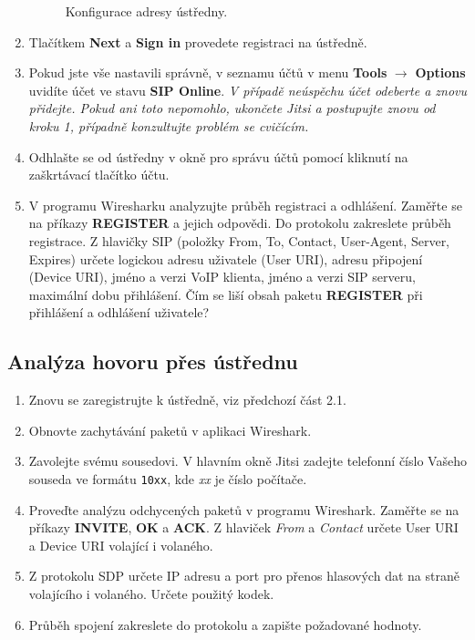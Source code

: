 \begin{enumerate}
\begin{figure}[h!]
        \caption{Konfigurace adresy ústředny.}
        \label{fig:registration2}
      \end{figure}
    \item Tlačítkem {\bf Next} a {\bf Sign in} provedete registraci na ústředně.
    \item  Pokud jste vše nastavili správně, v seznamu účtů v menu {\bf Tools} $\rightarrow$ {\bf Options} uvidíte účet ve stavu {\bf SIP Online}. {\it V případě neúspěchu účet odeberte a znovu přidejte. Pokud ani toto nepomohlo, ukončete Jitsi a postupujte znovu od kroku 1, případně konzultujte problém se cvičícím.}
    \item Odhlašte se od ústředny v okně pro správu účtů pomocí kliknutí na
      zaškrtávací tlačítko účtu.
    \item V programu Wiresharku analyzujte průběh registraci a odhlášení. Zaměřte se na příkazy {\bf REGISTER} a jejich odpovědi. Do protokolu zakreslete průběh registrace. Z hlavičky SIP (položky From, To, Contact, User-Agent, Server, Expires) určete logickou adresu uživatele (User URI), adresu připojení (Device URI), jméno a verzi VoIP klienta, jméno a verzi SIP serveru, maximální dobu přihlášení. Čím se liší obsah paketu {\bf REGISTER} při přihlášení a odhlášení uživatele?
\end{enumerate}

\subsection{Analýza hovoru přes ústřednu}
\begin{enumerate}
    \item Znovu se zaregistrujte k ústředně, viz předchozí část 2.1.
    \item Obnovte zachytávání paketů v aplikaci Wireshark.
    \item Zavolejte svému sousedovi. V hlavním okně Jitsi zadejte telefonní číslo Vašeho souseda ve formátu {\tt 10xx}, kde {\it xx} je číslo počítače.
    \item Proveďte analýzu odchycených paketů v programu Wireshark. Zaměřte se na příkazy {\bf INVITE}, {\bf OK} a {\bf ACK}. Z hlaviček {\it From} a {\it Contact} určete User URI a Device URI volající i volaného.
    \item Z protokolu SDP určete IP adresu a port pro přenos hlasových dat na straně volajícího i volaného. Určete použitý kodek. 
    \item Průběh spojení zakreslete do protokolu a zapište požadované hodnoty. 
\end{enumerate}

